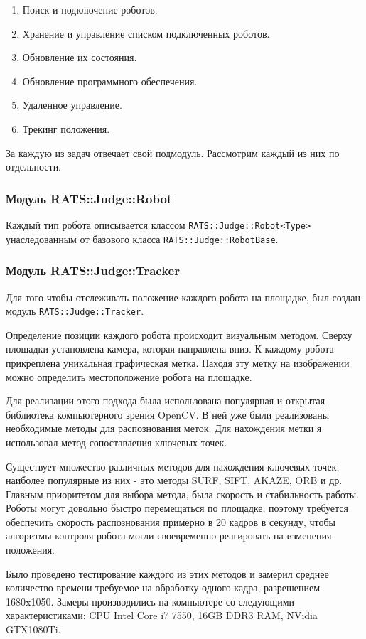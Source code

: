 \documentclass[a4paper,12pt]{article}
\begin{document}
\begin{enumerate}
    \item Поиск и подключение роботов.
    \item Хранение и управление списком подключенных роботов.
    \item Обновление их состояния.
    \item Обновление программного обеспечения.
    \item Удаленное управление.
    \item Трекинг положения.
\end{enumerate}

За каждую из задач отвечает свой подмодуль. Рассмотрим каждый из них по отдельности.

\subsubsection{Модуль RATS::Judge::Robot}
Каждый тип робота описывается классом \verb+RATS::Judge::Robot<Type>+ унаследованным от базового класса \verb+RATS::Judge::RobotBase+.

\subsubsection{Модуль RATS::Judge::Tracker}
Для того чтобы отслеживать положение каждого робота на площадке, был создан модуль \verb+RATS::Judge::Tracker+.

Определение позиции каждого робота происходит визуальным методом. Сверху площадки установлена камера, которая направлена вниз. К каждому робота прикреплена уникальная графическая метка. Находя эту метку на изображении можно определить местоположение робота на площадке.

Для реализации этого подхода была использована популярная и открытая библиотека компьютерного зрения OpenCV. В ней уже были реализованы необходимые методы для распознования меток. Для нахождения метки я использовал метод сопоставления ключевых точек.

Существует множество различных методов для нахождения ключевых точек, наиболее популярные из них - это методы SURF, SIFT, AKAZE, ORB и др. Главным приоритетом для выбора метода, была скорость и стабильность работы. Роботы могут довольно быстро перемещаться по площадке, поэтому требуется обеспечить скорость распознования примерно в 20 кадров в секунду, чтобы алгоритмы контроля робота могли своевременно реагировать на изменения положения. 

Было проведено тестирование каждого из этих методов и замерил среднее количество времени требуемое на обработку одного кадра, разрешением 1680x1050. Замеры производились на компьютере со следующими характеристиками: 
CPU Intel Core i7 7550, 16GB DDR3 RAM, NVidia GTX1080Ti.
\end{document}

